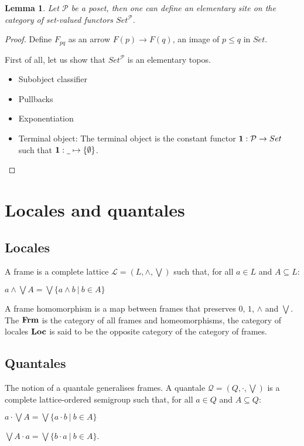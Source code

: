 \documentclass[a4paper]{article}
\theoremstyle{defin}
\theoremstyle{theorem}
\theoremstyle{claim}
\theoremstyle{prop}
\theoremstyle{lemma}
\newtheorem{lemma}{Lemma}
\theoremstyle{fact}
\theoremstyle{ex}
\theoremstyle{col}
\begin{document}
\begin{lemma}
Let $\mathcal{P}$ be a poset, then one can define an elementary site on the category of set-valued functors $Set^{\mathcal{P}}$.
\end{lemma}

\begin{proof}
Define $F_{pq}$ as an arrow $F(p) \to F(q)$, an image of $p \leq q$ in $Set$.

First of all, let us show that $Set^{\mathcal{P}}$ is an elementary topos.
\begin{itemize}
\item Subobject classifier
\item Pullbacks
\item Exponentiation
\item Terminal object:
The terminal object is the constant functor ${\bf 1 } : \mathcal{P} \to Set$ such that ${\bf 1} : \underline{\:\:} \mapsto \{ \emptyset \}$.
\end{itemize}
\end{proof}


\section{Locales and quantales}

\subsection{Locales}

A frame is a complete lattice $\mathcal{L} = (L, \wedge, \bigvee)$ such that, for all $a \in L$ and $A \subseteq L$:
\begin{center}
$a \wedge \bigvee A = \bigvee \{ a \wedge b \: | \: b \in A \}$
\end{center}
A frame homomorphism is a map between frames that preserves $0$, $1$, $\wedge$ and $\bigvee$. The ${\bf Frm}$ is the category of all frames and homeomorphisms, the category of locales ${\bf Loc}$ is said to be the opposite category of the category of frames.

\subsection{Quantales}

The notion of a quantale generalises frames. A quantale $\mathcal{Q} = (Q, \cdot, \bigvee)$ is a complete lattice-ordered semigroup such that, for all $a \in Q$ and $A \subseteq Q$:
\begin{center}
$a \cdot \bigvee A = \bigvee \{ a \cdot b \: | \: b \in A \}$

$\bigvee A \cdot a = \bigvee \{ b \cdot a \: | \: b \in A \}$.
\end{center}
\end{document}
